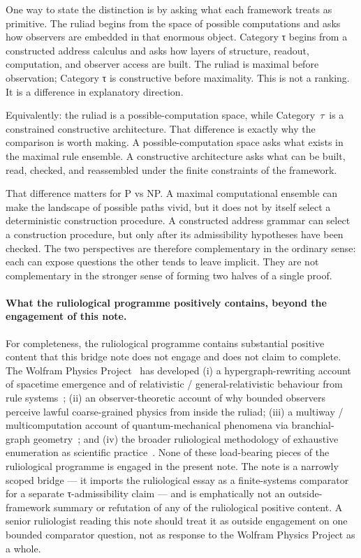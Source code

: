 \documentclass{pantarhei-researchnote}
\newcommand{\CategoryTau}{Category~\(\tau\)}
\begin{document}
One way to state the distinction is by asking what each framework treats
as primitive. The ruliad begins from the space of possible computations
and asks how observers are embedded in that enormous object. Category τ
begins from a constructed address calculus and asks how layers of
structure, readout, computation, and observer access are built. The
ruliad is maximal before observation; Category τ is constructive before
maximality. This is not a ranking. It is a difference in explanatory
direction.

Equivalently: the ruliad is a possible-computation space, while
\CategoryTau\ is a constrained constructive architecture. That difference
is exactly why the comparison is worth making. A possible-computation
space asks what exists in the maximal rule ensemble. A constructive
architecture asks what can be built, read, checked, and reassembled under
the finite constraints of the framework.

That difference matters for P vs NP. A maximal computational ensemble can
make the landscape of possible paths vivid, but it does not by itself
select a deterministic construction procedure. A constructed address
grammar can select a construction procedure, but only after its
admissibility hypotheses have been checked. The two perspectives are
therefore complementary in the ordinary sense: each can expose questions
the other tends to leave implicit. They are not complementary in the
stronger sense of forming two halves of a single proof.

\paragraph{What the ruliological programme positively contains, beyond the engagement of this note.}
For completeness, the ruliological programme contains substantial
positive content that this bridge note does not engage and does not claim
to complete. The Wolfram Physics
Project~\cite{Wolfram2020FundamentalPhysics,Wolfram2021WhatIsRuliad} has
developed (i) a hypergraph-rewriting account of spacetime emergence and
of relativistic / general-relativistic behaviour from rule
systems~\cite{GorardHypergraphRewriting}; (ii) an observer-theoretic
account of why bounded observers perceive lawful coarse-grained physics
from inside the ruliad; (iii) a multiway / multicomputation account of
quantum-mechanical phenomena via branchial-graph
geometry~\cite{ArsiwallaGorardMulticomputation}; and (iv) the broader
ruliological methodology of exhaustive enumeration as scientific
practice~\cite{Wolfram2002NKS}. None of these load-bearing pieces of the
ruliological programme is engaged in the present note. The note is a
narrowly scoped bridge — it imports the ruliological essay as a
finite-systems comparator for a separate τ-admissibility claim — and is
emphatically not an outside-framework summary or refutation of any of
the ruliological positive content. A senior ruliologist reading this
note should treat it as outside engagement on one bounded comparator
question, not as response to the Wolfram Physics Project as a whole.
\end{document}
